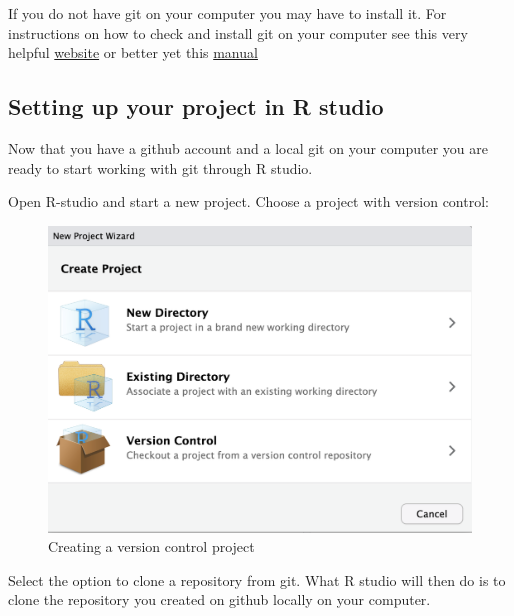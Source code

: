 \documentclass[
  letterpaper,
  DIV=11,
  numbers=noendperiod]{scrartcl}
\begin{document}
If you do not have git on your computer you may have to install it. For
instructions on how to check and install git on your computer see this
very helpful
\href{https://jennybc.github.io/2014-05-12-ubc/ubc-r/session03_git.html}{website}
or better yet this \href{https://happygitwithr.com/index.html}{manual}

\hypertarget{setting-up-your-project-in-r-studio}{%
\subsection{Setting up your project in R
studio}\label{setting-up-your-project-in-r-studio}}

Now that you have a github account and a local git on your computer you
are ready to start working with git through R studio.

Open R-studio and start a new project. Choose a project with version
control:

\begin{figure}

{\centering \includegraphics{figures/5.PNG}

}

\caption{Creating a version control project}

\end{figure}

Select the option to clone a repository from git. What R studio will
then do is to clone the repository you created on github locally on your
computer.
\end{document}
